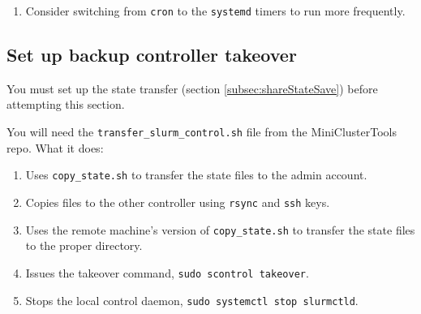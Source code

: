 \begin{enumerate}

\item Consider switching from \texttt{cron} to the \texttt{systemd} timers to run more frequently.
\end{enumerate}

\subsection{Set up backup controller takeover} \label{subsec:SetupBackupTakeover}

You must set up the state transfer (section \ref{subsec:shareStateSave}) before attempting this section.

You will need the \texttt{transfer\_slurm\_control.sh} file from the MiniClusterTools repo. What it does:

\begin{enumerate}
	\item Uses \texttt{copy\_state.sh} to transfer the state files to the admin account.

	\item Copies files to the other controller using \texttt{rsync} and \texttt{ssh} keys.

	\item Uses the remote machine's version of \texttt{copy\_state.sh} to transfer the state files to the proper directory.

	\item Issues the takeover command, \texttt{sudo scontrol takeover}.

	\item Stops the local control daemon, \texttt{sudo systemctl stop slurmctld}.
\end{enumerate}

